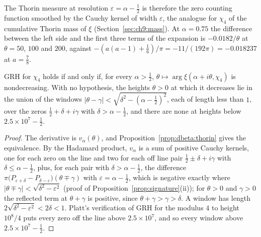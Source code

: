 The Thorin measure at resolution $\varepsilon=\alpha-\frac12$ is therefore the zero counting function smoothed by the Cauchy kernel of width $\varepsilon$, the analogue for $\chi_4$ of the cumulative Thorin mass of $\xi$ (Section~\ref{sec:ch9:mass}). At $\alpha=0.75$ the difference between the left side and the first three terms of the expansion is $-0.0182/\theta$ at $\theta=50$, $100$ and $200$, against $-(a(a-1)+\frac16)/\pi=-11/(192\pi)=-0.018237$ at $a=\frac78$.

\begin{corollary}\label{cor:dbeta:argmono}
GRH for $\chi_4$ holds if and only if, for every $\alpha>\frac12$, $\theta\mapsto\arg\xi(\alpha+i\theta,\chi_4)$ is nondecreasing. With no hypothesis, the heights $\theta>0$ at which it decreases lie in the union of the windows $|\theta-\gamma|<\sqrt{\delta^2-(\alpha-\frac12)^2}$, each of length less than $1$, over the zeros $\frac12+\delta+i\gamma$ with $\delta>\alpha-\frac12$, and there are none at heights below $2.5\times10^7-\frac12$.
\end{corollary}

\begin{proof}
The derivative is $v_\alpha(\theta)$, and Proposition~\ref{prop:dbeta:thorin} gives the equivalence. By the Hadamard product, $v_\alpha$ is a sum of positive Cauchy kernels, one for each zero on the line and two for each off line pair $\frac12\pm\delta+i\gamma$ with $\delta\le\alpha-\frac12$, plus, for each pair with $\delta>\alpha-\frac12$, the difference $\pi\big(P_{\varepsilon+\delta}-P_{\delta-\varepsilon}\big)(\theta\mp\gamma)$ with $\varepsilon=\alpha-\frac12$, which is negative exactly where $|\theta\mp\gamma|<\sqrt{\delta^2-\varepsilon^2}$ (proof of Proposition~\ref{prop:signature}(ii)); for $\theta>0$ and $\gamma>0$ the reflected term at $\theta+\gamma$ is positive, since $\theta+\gamma>\gamma>\delta$. A window has length $2\sqrt{\delta^2-\varepsilon^2}<2\delta<1$. Platt's verification of GRH for the modulus $4$ to height $10^8/4$ \cite{Platt16} puts every zero off the line above $2.5\times10^7$, and so every window above $2.5\times10^7-\frac12$.
\end{proof}


